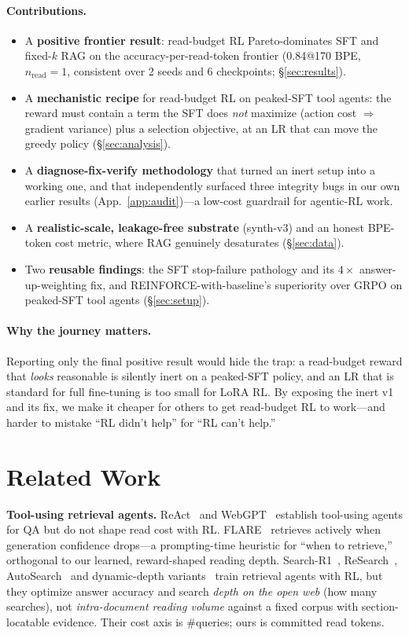 \documentclass[10pt,twocolumn]{article}
\begin{document}
\paragraph{Contributions.}
\begin{itemize}\itemsep0pt
\item A \textbf{positive frontier result}: read-budget RL Pareto-dominates SFT and fixed-$k$ RAG on the accuracy-per-read-token frontier (0.84@170 BPE, $n_{\text{read}}{=}1$, consistent over 2 seeds and 6 checkpoints; \S\ref{sec:results}).
\item A \textbf{mechanistic recipe} for read-budget RL on peaked-SFT tool agents: the reward must contain a term the SFT does \emph{not} maximize (action cost $\Rightarrow$ gradient variance) plus a selection objective, at an LR that can move the greedy policy (\S\ref{sec:analysis}).
\item A \textbf{diagnose-fix-verify methodology} that turned an inert setup into a working one, and that independently surfaced three integrity bugs in our own earlier results (App.~\ref{app:audit})---a low-cost guardrail for agentic-RL work.
\item A \textbf{realistic-scale, leakage-free substrate} (synth-v3) and an honest BPE-token cost metric, where RAG genuinely desaturates (\S\ref{sec:data}).
\item Two \textbf{reusable findings}: the SFT stop-failure pathology and its $4\times$ answer-up-weighting fix, and REINFORCE-with-baseline's superiority over GRPO on peaked-SFT tool agents (\S\ref{sec:setup}).
\end{itemize}

\paragraph{Why the journey matters.} Reporting only the final positive result would hide the trap: a read-budget reward that \emph{looks} reasonable is silently inert on a peaked-SFT policy, and an LR that is standard for full fine-tuning is too small for LoRA RL. By exposing the inert v1 and its fix, we make it cheaper for others to get read-budget RL to work---and harder to mistake ``RL didn't help'' for ``RL can't help.''

\section{Related Work}
\label{sec:related}
\textbf{Tool-using retrieval agents.} ReAct~\cite{react2023} and WebGPT~\cite{webgpt2022} establish tool-using agents for QA but do not shape read cost with RL. FLARE~\cite{flare} retrieves actively when generation confidence drops---a prompting-time heuristic for ``when to retrieve,'' orthogonal to our learned, reward-shaped reading depth. Search-R1~\cite{searchr1}, ReSearch~\cite{research}, AutoSearch~\cite{autosearch} and dynamic-depth variants~\cite{dynsearchr1} train retrieval agents with RL, but they optimize answer accuracy and search \emph{depth on the open web} (how many searches), not \emph{intra-document reading volume} against a fixed corpus with section-locatable evidence. Their cost axis is \#queries; ours is committed read tokens.
\end{document}
